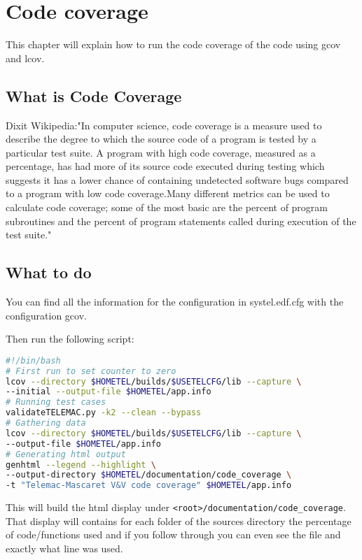 %
\chapter{Code coverage}
%
This chapter will explain how to run the code coverage of the code using gcov and lcov.
%
%
\section{What is Code Coverage}
%
%
Dixit Wikipedia:"In computer science, code coverage is a measure used to
describe the degree to which the source code of a program is tested by a
particular test suite. A program with high code coverage, measured as a
percentage, has had more of its source code executed during testing which
suggests it has a lower chance of containing undetected software bugs compared
to a program with low code coverage.Many different metrics can be used to
calculate code coverage; some of the most basic are the percent of program
subroutines and the percent of program statements called during execution of
the test suite."
%
%
\section{What to do}
%
%
You can find all the information for the configuration in systel.edf.cfg with
the configuration gcov.

Then run the following script:
\begin{lstlisting}[language=bash]
#!/bin/bash
# First run to set counter to zero
lcov --directory $HOMETEL/builds/$USETELCFG/lib --capture \
--initial --output-file $HOMETEL/app.info
# Running test cases
validateTELEMAC.py -k2 --clean --bypass
# Gathering data
lcov --directory $HOMETEL/builds/$USETELCFG/lib --capture \
--output-file $HOMETEL/app.info
# Generating html output
genhtml --legend --highlight \
--output-directory $HOMETEL/documentation/code_coverage \
-t "Telemac-Mascaret V&V code coverage" $HOMETEL/app.info
\end{lstlisting}

This will build the html display under
\verb!<root>/documentation/code_coverage!. That display will contains for each
folder of the sources directory the percentage of code/functions used and if
you follow through you can even see the file and exactly what line was used.
